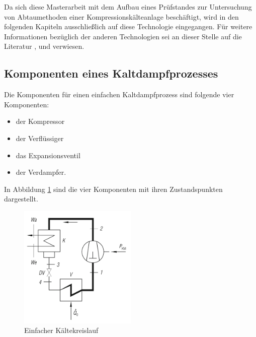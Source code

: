 
Da sich diese Masterarbeit mit dem Aufbau eines Prüfstandes zur Untersuchung von Abtaumethoden einer Kompressionskälteanlage beschäftigt, wird in den folgenden Kapiteln ausschließlich auf diese Technologie eingegangen. Für weitere Informationen bezüglich der anderen Technologien sei an dieser Stelle auf die Literatur \citep{Baehr2013}, \citep{Grote2014} und \citep{Grote2014} verwiesen.



\subsection{Komponenten eines Kaltdampfprozesses}
\label{subsec:Komponenten eines Kaltdampfprozesses}

Die Komponenten für einen einfachen Kaltdampfprozess  sind folgende vier Komponenten:

\begin{itemize}
\item der Kompressor
\item der Verflüssiger 
\item das Expansionsventil
\item der Verdampfer. 
\end{itemize}

In Abbildung \ref{fig:einfacher Kältekreislauf} sind die vier Komponenten mit ihren Zustandspunkten dargestellt.

\begin{figure}[htb]
\centering		\includegraphics[width=0.50\textwidth]{Pictures/Kaltekreislauf_beahr.png}
\caption{Einfacher Kältekreislauf \citep{Baehr2013}}
\label{fig:einfacher Kältekreislauf}
\end{figure}


